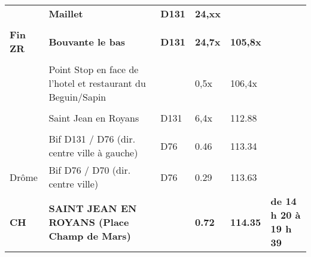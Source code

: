 \documentclass{article}%
\begin{document}
\begin{longtable}{p{2.25cm}|p{6.7cm}|p{2.0cm}|p{1.5cm}|p{1.5cm}|p{3.5cm}}
 &\textbf{Maillet}&\textbf{D131}&\textbf{24,xx}& & \\%
 & & & & & \\%
\textbf{Fin ZR}&\textbf{Bouvante le bas}&\textbf{D131}&\textbf{24,7x}&\textbf{105,8x}& \\%
 & & & & & \\%
 &Point Stop en face de l'hotel et restaurant du Beguin/Sapin& &0,5x&106,4x& \\%
 & & & & & \\%
 &Saint Jean en Royans&D131&6,4x&112.88& \\%
 & & & & & \\%
 &Bif D131 / D76 (dir. centre ville à gauche)&D76&0.46&113.34& \\%
Drôme&Bif D76 / D70 (dir. centre ville)&D76&0.29&113.63& \\%
\textbf{CH}&\textbf{SAINT JEAN EN ROYANS (Place Champ de Mars)}& &\textbf{0.72}&\textbf{114.35}&\textbf{de 14 h 20 à 19 h 39}\\%
\hline%
\end{longtable}%
\end{document}
